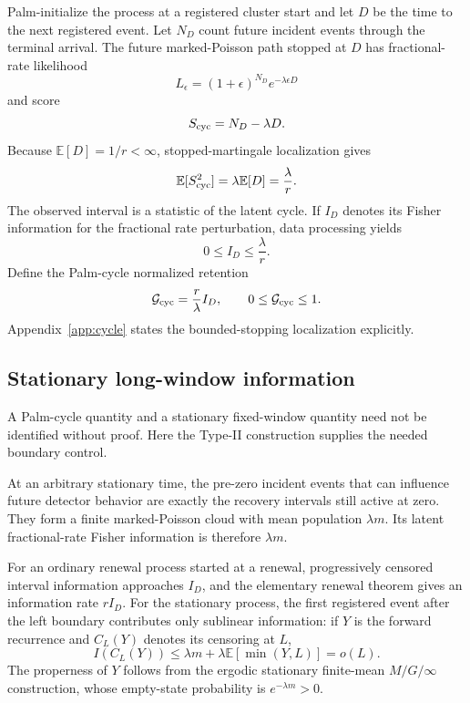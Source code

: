 \documentclass[aps,prapplied,preprint,nofootinbib]{revtex4-2}
\newcommand{\Gcyc}{\mathcal G_{\rm cyc}}
\newcommand{\E}{\mathbb E}
\begin{document}
Palm-initialize the process at a registered cluster start and let $D$ be the time to the next registered event. Let $N_D$ count future incident events through the terminal arrival. The future marked-Poisson path stopped at $D$ has fractional-rate likelihood
\begin{equation}
L_\epsilon=(1+\epsilon)^{N_D}e^{-\lambda\epsilon D}
\end{equation}
and score
\begin{equation}
S_{\rm cyc}=N_D-\lambda D.
\label{eq:cycleScore}
\end{equation}
Because $\E[D]=1/r<\infty$, stopped-martingale localization gives
\begin{equation}
\E[S_{\rm cyc}^2]
=\lambda\E[D]
=\frac{\lambda}{r}.
\label{eq:cycleFI}
\end{equation}
The observed interval is a statistic of the latent cycle. If $I_D$ denotes its Fisher information for the fractional rate perturbation, data processing yields
\begin{equation}
0\le I_D\le\frac{\lambda}{r}.
\end{equation}
Define the Palm-cycle normalized retention
\begin{equation}
\Gcyc=\frac{r}{\lambda}I_D,
\qquad
0\le\Gcyc\le1.
\label{eq:Gcyc}
\end{equation}
Appendix~\ref{app:cycle} states the bounded-stopping localization explicitly.

\subsection{Stationary long-window information}

A Palm-cycle quantity and a stationary fixed-window quantity need not be identified without proof. Here the Type-II construction supplies the needed boundary control.

At an arbitrary stationary time, the pre-zero incident events that can influence future detector behavior are exactly the recovery intervals still active at zero. They form a finite marked-Poisson cloud with mean population $\lambda m$. Its latent fractional-rate Fisher information is therefore $\lambda m$.

For an ordinary renewal process started at a renewal, progressively censored interval information approaches $I_D$, and the elementary renewal theorem gives an information rate $rI_D$. For the stationary process, the first registered event after the left boundary contributes only sublinear information: if $Y$ is the forward recurrence and $C_L(Y)$ denotes its censoring at $L$,
\begin{equation}
I(C_L(Y))
\le \lambda m+\lambda\E[\min(Y,L)]
=o(L).
\label{eq:boundaryFI}
\end{equation}
The properness of $Y$ follows from the ergodic stationary finite-mean $M/G/\infty$ construction, whose empty-state probability is $e^{-\lambda m}>0$.
\end{document}
